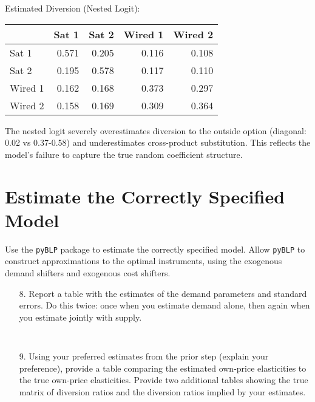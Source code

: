 \documentclass[english,11pt]{article}
\begin{document}
\begin{enumerate}
Estimated Diversion (Nested Logit):
\begin{center}
\begin{tabular}{lrrrr}
\hline
 & Sat 1 & Sat 2 & Wired 1 & Wired 2 \\
\hline
Sat 1 & 0.571 & 0.205 & 0.116 & 0.108 \\
Sat 2 & 0.195 & 0.578 & 0.117 & 0.110 \\
Wired 1 & 0.162 & 0.168 & 0.373 & 0.297 \\
Wired 2 & 0.158 & 0.169 & 0.309 & 0.364 \\
\hline
\end{tabular}
\end{center}

The nested logit severely overestimates diversion to the outside option (diagonal: 0.02 vs 0.37-0.58) and underestimates cross-product substitution. This reflects the model's failure to capture the true random coefficient structure.

\section{Estimate the Correctly Specified Model}

Use the \texttt{pyBLP} package to estimate the correctly specified model. Allow
\texttt{pyBLP} to construct approximations to the optimal instruments, using the
exogenous demand shifters and exogenous cost shifters.

\begin{enumerate}
\item[8.] Report a table with the estimates of the demand
parameters and standard errors. Do this twice: once when you estimate demand
alone, then again when you estimate jointly with supply.

\begin{verbatim}
    
\end{verbatim}

\item[9.] Using your preferred estimates from the prior step (explain your
preference), provide a table comparing the estimated own-price elasticities
to the true own-price elasticities. Provide two additional tables showing
the true matrix of diversion ratios and the diversion ratios implied by your
estimates.

\begin{verbatim}
    
\end{verbatim}


\end{enumerate}
\end{enumerate}
\end{document}
